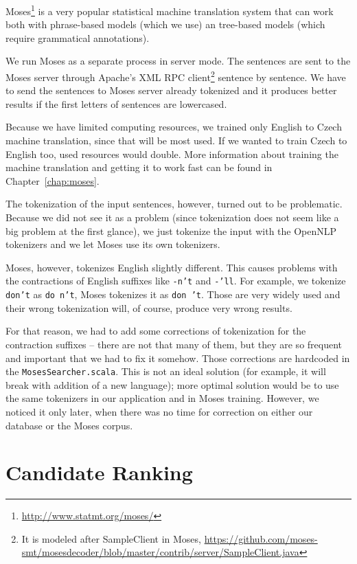 Moses\footnote{\url{http://www.statmt.org/moses/}} is a very popular statistical machine translation system that can work both with phrase-based models (which we use) an tree-based models (which require grammatical annotations).

We run Moses as a separate process in server mode. The sentences are sent to the Moses server through Apache's XML RPC client\footnote{It is modeled after SampleClient in Moses, \url{https://github.com/moses-smt/mosesdecoder/blob/master/contrib/server/SampleClient.java}} sentence by sentence. We have to send the sentences to Moses server already tokenized and it produces better results if the first letters of sentences are lowercased.

Because we have limited computing resources, we trained only English to Czech machine translation, since that will be most used. If we wanted to train Czech to English too, used resources would double. More information about training the machine translation and getting it to work fast can be found in Chapter~\ref{chap:moses}.

The tokenization of the input sentences, however, turned out to be problematic. Because we did not see it as a problem (since tokenization does not seem like a big problem at the first glance), we just tokenize the input with the OpenNLP tokenizers and we let Moses use its own tokenizers.

Moses, however, tokenizes English slightly different. This causes problems with the contractions of English suffixes like \texttt{-n't} and \texttt{-'ll}. For example, we tokenize \texttt{don't} as \texttt{do n't}, Moses tokenizes it as \texttt{don 't}. Those are very widely used and their wrong tokenization will, of course, produce very wrong results.

For that reason, we had to add some corrections of tokenization for the contraction suffixes -- there are not that many of them, but they are so frequent and important that we had to fix it somehow. Those corrections are hardcoded in the \texttt{MosesSearcher.scala}. This is not an ideal solution (for example, it will break with addition of a new language); more optimal solution would be to use the same tokenizers in our application and in Moses training. However, we noticed it only later, when there was no time for correction on either our database or the Moses corpus.


\section{Candidate Ranking}
\label{sec:ranking}

